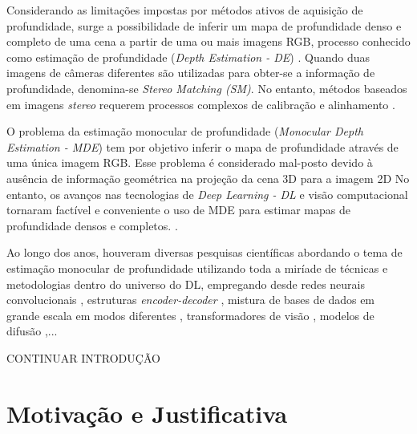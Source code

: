 


Considerando as limitações impostas por métodos ativos de aquisição de profundidade, surge a possibilidade de inferir um mapa de profundidade denso e completo de uma cena a partir de uma ou mais imagens RGB, processo conhecido como estimação de profundidade (\textit{Depth Estimation - DE}) \cite{rajapaksha2024deep}. Quando duas imagens de câmeras diferentes são utilizadas para obter-se a informação de profundidade, denomina-se \textit{Stereo Matching (SM)}. No entanto, métodos baseados em imagens \textit{stereo} requerem processos complexos de calibração e alinhamento \cite{dong2022towards}.


O problema da estimação monocular de profundidade (\textit{Monocular Depth Estimation - MDE}) tem por objetivo inferir o mapa de profundidade através de uma única imagem RGB. Esse problema é considerado mal-posto devido à ausência de informação geométrica na projeção da cena 3D para a imagem 2D No entanto, os avanços nas tecnologias de \textit{Deep Learning - DL} e visão computacional tornaram factível e conveniente o uso de MDE para estimar mapas de profundidade densos e completos. \cite{spencer2024third} \cite{rajapaksha2024deep}. 

Ao longo dos anos, houveram diversas pesquisas científicas abordando o tema de estimação monocular de profundidade utilizando toda a miríade de técnicas e metodologias dentro do universo do DL, empregando desde redes neurais convolucionais \cite{kopf2021robust}, estruturas \textit{encoder-decoder} \cite{godard2019digging}, mistura de bases de dados em grande escala em modos diferentes \cite{lasinger2019towards}, transformadores de visão \cite{birkl2023midas}, modelos de difusão \cite{ke2024repurposing},... 

CONTINUAR INTRODUÇÃO



\section{Motivação e Justificativa} 


